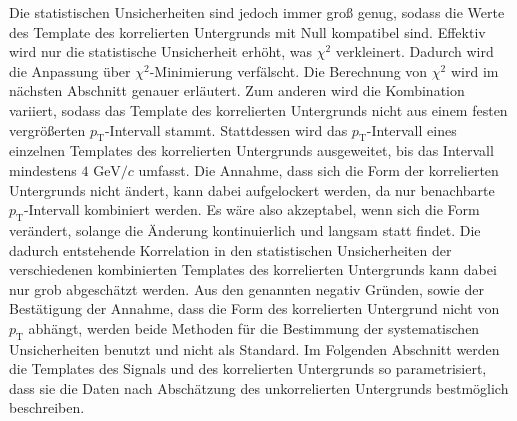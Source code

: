 Die statistischen Unsicherheiten sind jedoch immer groß genug, sodass die Werte des Template des korrelierten Untergrunds mit Null kompatibel sind.
Effektiv wird nur die statistische Unsicherheit erhöht, was $\chi^{2}$ verkleinert.
Dadurch wird die Anpassung über $\chi^{2}$-Minimierung verfälscht.
Die Berechnung von $\chi^{2}$ wird im nächsten Abschnitt genauer erläutert.
\newline
Zum anderen wird die Kombination variiert, sodass das Template des korrelierten Untergrunds nicht aus einem festen vergrößerten $p_\text{T}$-Intervall stammt.
Stattdessen wird das $p_\text{T}$-Intervall eines einzelnen Templates des korrelierten Untergrunds ausgeweitet, bis das Intervall mindestens $4\text{ GeV}/c$ umfasst.
Die Annahme, dass sich die Form der korrelierten Untergrunds nicht ändert, kann dabei aufgelockert werden, da nur benachbarte $p_\text{T}$-Intervall kombiniert werden.
Es wäre also akzeptabel, wenn sich die Form verändert, solange die Änderung kontinuierlich und langsam statt findet.
Die dadurch entstehende Korrelation in den statistischen Unsicherheiten der verschiedenen kombinierten Templates des korrelierten Untergrunds kann dabei nur grob abgeschätzt werden. 
\newline
Aus den genannten negativ Gründen, sowie der Bestätigung der Annahme, dass die Form des korrelierten Untergrund nicht von $p_\text{T}$ abhängt, werden beide Methoden für die Bestimmung der systematischen Unsicherheiten benutzt und nicht als Standard.
\newline
Im Folgenden Abschnitt werden die Templates des Signals und des korrelierten Untergrunds so parametrisiert, dass sie die Daten nach Abschätzung des unkorrelierten Untergrunds bestmöglich beschreiben.
